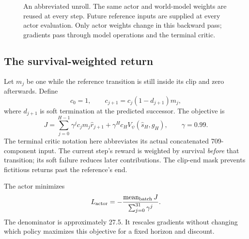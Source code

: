 \documentclass[11pt,a4paper]{article}
\begin{document}
\begin{figure}[htbp]
\centering
{}
\caption{An abbreviated unroll. The same actor and world-model weights are reused
at every step. Future reference inputs are supplied at every actor evaluation.
Only actor weights change in this backward pass; gradients pass through model
operations and the terminal critic.}
\end{figure}

\subsection{The survival-weighted return}
Let $m_j$ be one while the reference transition is still inside its clip and
zero afterwards. Define
\begin{equation}
c_0=1,\qquad c_{j+1}=c_j(1-d_{j+1})m_j,
\end{equation}
where $d_{j+1}$ is soft termination at the predicted successor. The objective is
\begin{equation}\label{eq:actorobjective}
J=\sum_{j=0}^{H-1}\gamma^j c_j m_j\hat r_{j+1}
+\gamma^H c_H V_\psi(\hat s_H,g_H),\qquad\gamma=0.99.
\end{equation}
The terminal critic notation here abbreviates its actual concatenated
709-component input. The current step's reward is weighted by survival
\emph{before} that transition; its soft failure reduces later contributions.
The clip-end mask prevents fictitious returns past the reference's end.

The actor minimizes
\begin{equation}
L_{\rm actor}=-\frac{\operatorname{mean}_{\rm batch}J}
{\sum_{j=0}^{31}\gamma^j}.
\end{equation}
The denominator is approximately 27.5. It rescales gradients without changing
which policy maximizes this objective for a fixed horizon and discount.
\end{document}
